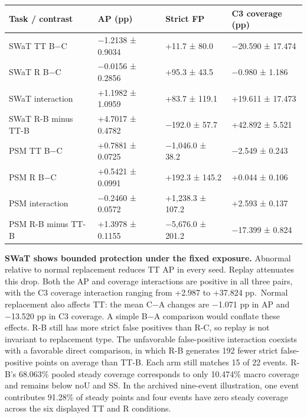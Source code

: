 \documentclass[
  american,
]{article}
\begin{document}
\begin{longtable}[]{@{}
  >{\raggedright\arraybackslash}p{}
  >{\raggedleft\arraybackslash}p{}
  >{\raggedleft\arraybackslash}p{}
  >{\raggedleft\arraybackslash}p{}@{}}
\toprule\noalign{}
\begin{minipage}[b]{\linewidth}\raggedright
Task / contrast
\end{minipage} & \begin{minipage}[b]{\linewidth}\raggedleft
AP (pp)
\end{minipage} & \begin{minipage}[b]{\linewidth}\raggedleft
Strict FP
\end{minipage} & \begin{minipage}[b]{\linewidth}\raggedleft
C3 coverage (pp)
\end{minipage} \\
\midrule\noalign{}
\endhead
\bottomrule\noalign{}
\endlastfoot
SWaT TT B−C & −1.2138 ± 0.9034 & +11.7 ± 80.0 & −20.590 ± 17.474 \\
SWaT R B−C & −0.0156 ± 0.2856 & +95.3 ± 43.5 & −0.980 ± 1.186 \\
SWaT interaction & +1.1982 ± 1.0959 & +83.7 ± 119.1 & +19.611 ±
17.473 \\
SWaT R-B minus TT-B & +4.7017 ± 0.4782 & −192.0 ± 57.7 & +42.892 ±
5.521 \\
PSM TT B−C & +0.7881 ± 0.0725 & −1,046.0 ± 38.2 & −2.549 ± 0.243 \\
PSM R B−C & +0.5421 ± 0.0991 & +192.3 ± 145.2 & +0.044 ± 0.106 \\
PSM interaction & −0.2460 ± 0.0572 & +1,238.3 ± 107.2 & +2.593 ±
0.137 \\
PSM R-B minus TT-B & +1.3978 ± 0.1155 & −5,676.0 ± 201.2 & −17.399 ±
0.824 \\
\end{longtable}

\textbf{SWaT shows bounded protection under the fixed exposure.}
Abnormal relative to normal replacement reduces TT AP in every seed.
Replay attenuates this drop. Both the AP and coverage interactions are
positive in all three pairs, with the C3 coverage interaction ranging
from +2.987 to +37.824 pp.~Normal replacement also affects TT: the mean
C−A changes are −1.071 pp in AP and −13.520 pp in C3 coverage. A simple
B−A comparison would conflate these effects. R-B still has more strict
false positives than R-C, so replay is not invariant to replacement
type. The unfavorable false-positive interaction coexists with a
favorable direct comparison, in which R-B generates 192 fewer strict
false-positive points on average than TT-B. Each arm still matches 15 of
22 events. R-B's 68.063\% pooled steady coverage corresponds to only
10.474\% macro coverage and remains below noU and SS. In the archived
nine-event illustration, one event contributes 91.28\% of steady points
and four events have zero steady coverage across the six displayed TT
and R conditions.
\end{document}
